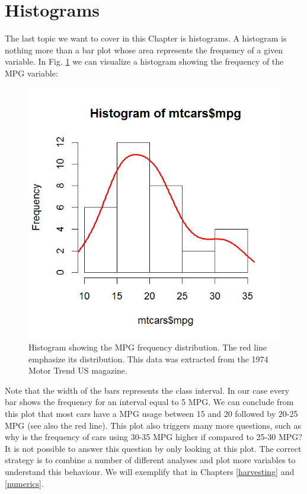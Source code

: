 \section{Histograms}

The last topic we want to cover in this Chapter is histograms. A histogram is nothing more than a bar plot whose area represents the frequency of a given variable. In Fig. \ref{fig:histch2} we can visualize a histogram showing the frequency of the MPG variable:

\begin{figure}[h]
	\begin{center}
			\includegraphics[scale=0.7]{Parts/basics/histch2}
	\end{center}
	\caption{Histogram showing the MPG frequency distribution. The red line emphasize its distribution. This data was extracted from the 1974 Motor Trend US magazine.}
	\label{fig:histch2}
\end{figure} 

\newpage

Note that the width of the bars represents the class interval. In our case every bar shows the frequency for an interval equal to 5 MPG. We can conclude from this plot that most cars have a MPG usage between 15 and 20 followed by 20-25 MPG (see also the red line). This plot also triggers many more questions, such as why is the frequency of cars using 30-35 MPG higher if compared to 25-30 MPG? It is not  possible to answer this question by only looking at this plot. The correct strategy is to combine a number of different analyses and plot more variables to understand this behaviour. We will exemplify that in Chapters \ref{harvesting} and \ref{numerics}.